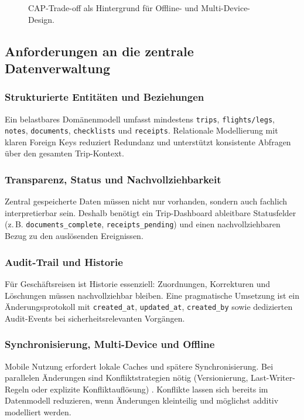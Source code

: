 \begin{figure}[H]
  \centering
  \caption{CAP-Trade-off als Hintergrund für Offline- und Multi-Device-Design.}
  \label{fig:cap_tradeoff}
\end{figure}

\subsection{Anforderungen an die zentrale Datenverwaltung}
\subsubsection{Strukturierte Entitäten und Beziehungen}
Ein belastbares Domänenmodell umfasst mindestens \texttt{trips},
\texttt{flights/legs}, \texttt{notes}, \texttt{documents}, \texttt{checklists}
und \texttt{receipts}. Relationale Modellierung mit klaren Foreign Keys reduziert
Redundanz und unterstützt konsistente Abfragen über den gesamten Trip-Kontext.

\subsubsection{Transparenz, Status und Nachvollziehbarkeit}
Zentral gespeicherte Daten müssen nicht nur vorhanden, sondern auch fachlich
interpretierbar sein. Deshalb benötigt ein Trip-Dashboard ableitbare
Statusfelder (z.\,B. \texttt{documents\_complete}, \texttt{receipts\_pending})
und einen nachvollziehbaren Bezug zu den auslösenden Ereignissen.

\subsubsection{Audit-Trail und Historie}
Für Geschäftsreisen ist Historie essenziell: Zuordnungen, Korrekturen und
Löschungen müssen nachvollziehbar bleiben. Eine pragmatische Umsetzung ist ein
Änderungsprotokoll mit \texttt{created\_at}, \texttt{updated\_at},
\texttt{created\_by} sowie dedizierten Audit-Events bei sicherheitsrelevanten
Vorgängen.

\subsubsection{Synchronisierung, Multi-Device und Offline}
Mobile Nutzung erfordert lokale Caches und spätere Synchronisierung. Bei
parallelen Änderungen sind Konfliktstrategien nötig (Versionierung,
Last-Writer-Regeln oder explizite Konfliktauflösung) \cite{firestoreOffline,
amplifyConflict}. Konflikte lassen sich bereits im Datenmodell reduzieren, wenn
Änderungen kleinteilig und möglichst additiv modelliert werden.

